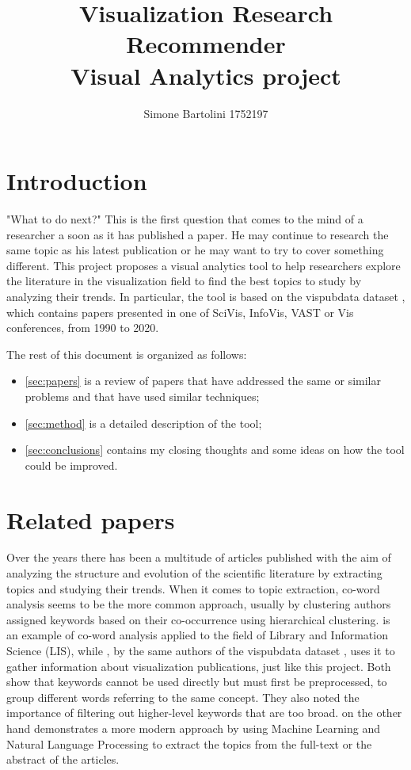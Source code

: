 \documentclass[11pt]{article}
\title{Visualization Research Recommender \\ \large Visual Analytics project}
\author{Simone Bartolini 1752197}
\date{}
\begin{document}
\maketitle
\thispagestyle{empty}

\section{Introduction}
"What to do next?" This is the first question that comes to the mind of a researcher a soon as it has published a paper. He may continue to research the same topic as his latest publication or he may want to try to cover something different. This project proposes a visual analytics tool to help researchers explore the literature in the visualization field to find the best topics to study by analyzing their trends. In particular, the tool is based on the vispubdata dataset \cite{7583708}, which contains papers presented in one of SciVis, InfoVis, VAST or Vis conferences, from 1990 to 2020. 

The rest of this document is organized as follows:
\begin{itemize}
\item \autoref{sec:papers} is a review of papers that have addressed the same or similar problems and that have used similar techniques;
\item \autoref{sec:method} is a detailed description of the tool;
\item \autoref{sec:conclusions} contains my closing thoughts and some ideas on how the tool could be improved.
\end{itemize}



\section{Related papers} \label{sec:papers}
Over the years there has been a multitude of articles published with the aim of analyzing the structure and evolution of the scientific literature by extracting topics and studying their trends. When it comes to topic extraction, co-word analysis seems to be the more common approach, usually by clustering authors assigned keywords based on their co-occurrence using hierarchical clustering. \cite{Hu2013ACA} is an example of co-word analysis applied to the field of Library and Information Science (LIS), while \cite{7539364}, by the same authors of the vispubdata dataset \cite{7583708}, uses it to gather information about visualization publications, just like this project. Both show that keywords cannot be used directly but must first be preprocessed, to group different words referring to the same concept. They also noted the importance of filtering out higher-level keywords that are too broad. \cite{9373186} on the other hand demonstrates a more modern approach by using Machine Learning and Natural Language Processing to extract the topics from the full-text or the abstract of the articles. 
\end{document}
